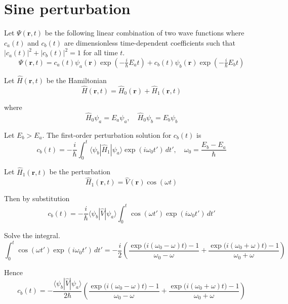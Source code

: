 

\section*{Sine perturbation}

Let $\Psi(\mathbf r,t)$ be the following linear combination of two wave functions
where $c_a(t)$ and $c_b(t)$ are dimensionless time-dependent coefficients
such that $|c_a(t)|^2+|c_b(t)|^2=1$ for all time $t$.
\begin{equation*}
\Psi(\mathbf r,t)
=c_a(t)\psi_a(\mathbf r)\exp\left(-\tfrac{i}{\hbar}E_at\right)
+c_b(t)\psi_b(\mathbf r)\exp\left(-\tfrac{i}{\hbar}E_bt\right)
\end{equation*}

Let $\hat H(\mathbf r,t)$ be the Hamiltonian
\begin{equation*}
\hat H(\mathbf r,t)=\hat H_0(\mathbf r)+\hat H_1(\mathbf r,t)
\end{equation*}

where
\begin{equation*}
\hat H_0\psi_a=E_a\psi_a,\quad\hat H_0\psi_b=E_b\psi_b
\end{equation*}

Let $E_b>E_a$.
The first-order perturbation solution for $c_b(t)$ is
\begin{equation*}
c_b(t)=-\frac{i}{\hbar}\int_0^t
\langle\psi_b|\hat H_1|\psi_a\rangle\exp(i\omega_0t')\,dt',\quad\omega_0=\frac{E_b-E_a}{\hbar}
\end{equation*}

Let $\hat H_1(\mathbf r,t)$ be the perturbation
\begin{equation*}
\hat H_1(\mathbf r,t)=\hat V(\mathbf r)\cos(\omega t)
\end{equation*}

Then by substitution
\begin{equation*}
c_b(t)=-\frac{i}{\hbar}\langle\psi_b|\hat V|\psi_a\rangle
\int_0^t\cos(\omega t')\exp(i\omega_0t')\,dt'
\end{equation*}

Solve the integral.
\begin{equation*}
\int_0^t\cos(\omega t')\exp(i\omega_0t')\,dt'
=-\frac{i}{2}
\left(
\frac{\exp\bigl(i(\omega_0-\omega)t\bigr)-1}{\omega_0-\omega}
+\frac{\exp\bigl(i(\omega_0+\omega)t\bigr)-1}{\omega_0+\omega}
\right)
\tag{1}
\end{equation*}

Hence
\begin{equation*}
c_b(t)=-\frac{\langle\psi_b|\hat V|\psi_a\rangle}{2\hbar}
\left(
\frac{\exp\bigl(i(\omega_0-\omega)t\bigr)-1}{\omega_0-\omega}
+\frac{\exp\bigl(i(\omega_0+\omega)t\bigr)-1}{\omega_0+\omega}
\right)
\tag{2}
\end{equation*}

